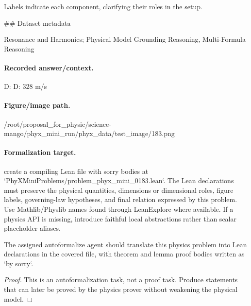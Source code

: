 Labels indicate each component, clarifying their roles in the setup.

\#\# Dataset metadata

Resonance and Harmonics; Physical Model Grounding Reasoning, Multi-Formula Reasoning

\paragraph{Recorded answer/context.}
D: D: 328 m/s

\paragraph{Figure/image path.}
/root/proposal\_for\_physic/science-mango/phyx\_mini\_run/phyx\_data/test\_image/183.png

\paragraph{Formalization target.}
create a compiling Lean file with sorry bodies at `PhyXMiniProblems/problem\_phyx\_mini\_0183.lean`. The Lean declarations must preserve the physical quantities, dimensions or dimensional roles, figure labels, governing-law hypotheses, and final relation expressed by this problem.
Use Mathlib/Physlib names found through LeanExplore where available. If a physics API is missing, introduce faithful local abstractions rather than scalar placeholder aliases.

\begin{theorem}
\label{thm:physics:phyx_mini_0183:target}
The assigned autoformalize agent should translate this physics problem into Lean declarations in the covered file, with theorem and lemma proof bodies written as `by sorry`.
\end{theorem}
\begin{proof}
This is an autoformalization task, not a proof task. Produce statements that can later be proved by the physics prover without weakening the physical model.
\end{proof}

